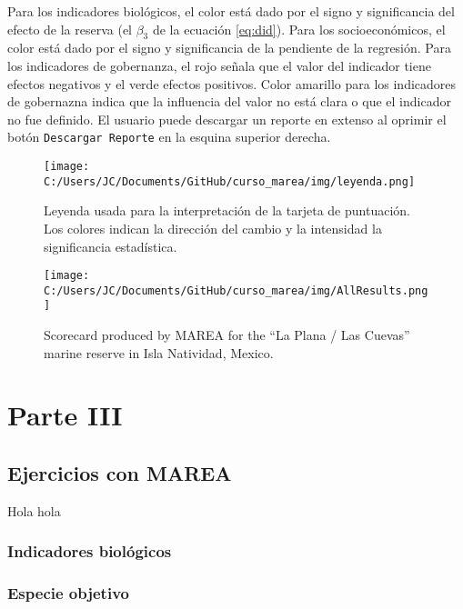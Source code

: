 \documentclass[]{krantz}
\begin{document}
Para los indicadores biológicos, el color está dado por el signo y
significancia del efecto de la reserva (el \(\beta_3\) de la ecuación
\eqref{eq:did}). Para los socioeconómicos, el color está dado por el signo
y significancia de la pendiente de la regresión. Para los indicadores de
gobernanza, el rojo señala que el valor del indicador tiene efectos
negativos y el verde efectos positivos. Color amarillo para los
indicadores de gobernazna indica que la influencia del valor no está
clara o que el indicador no fue definido. El usuario puede descargar un
reporte en extenso al oprimir el botón \texttt{Descargar\ Reporte} en la
esquina superior derecha.

\begin{figure}
\centering
\texttt{[image: C:/Users/JC/Documents/GitHub/curso\_marea/img/leyenda.png]}
\caption{\label{fig:leyenda}Leyenda usada para la interpretación de la
tarjeta de puntuación. Los colores indican la dirección del cambio y la
intensidad la significancia estadística.}
\end{figure}

\begin{figure}
\centering
\texttt{[image: C:/Users/JC/Documents/GitHub/curso\_marea/img/AllResults.png]}
\caption{\label{fig:resultados}Scorecard produced by MAREA for the ``La
Plana / Las Cuevas'' marine reserve in Isla Natividad, Mexico.}
\end{figure}

\hypertarget{part-parte-iii}{%
\part{Parte III}\label{part-parte-iii}}

\hypertarget{ejercicios-con-marea}{%
\chapter{Ejercicios con MAREA}\label{ejercicios-con-marea}}

Hola hola

\hypertarget{indicadores-biologicos}{%
\section{Indicadores biológicos}\label{indicadores-biologicos}}

\hypertarget{especie-objetivo}{%
\section{Especie objetivo}\label{especie-objetivo}}
\end{document}
